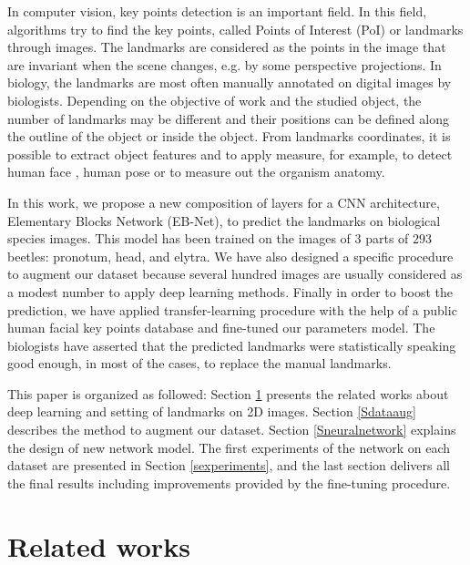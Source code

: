 \documentclass[review]{elsarticle}
\begin{document}
In computer vision, key points detection is an important field. In
this field, algorithms try to find the key points, called Points of
Interest (PoI)  or landmarks through images. The landmarks are
considered as the points in the image that are invariant when the
scene changes, e.g. by some perspective projections. In biology, the
landmarks are most often manually annotated on digital images by
biologists. Depending on the objective of work and the studied object,
the number of landmarks may be different and their positions
 can be defined along the outline of the object or inside the
object. From landmarks coordinates, it is possible to extract object
features and to apply measure, for example, to detect human face
\cite{sun2013deep}, human pose \cite{huang2017coarse} or to measure out the organism anatomy.

In this work, we propose  a new composition of layers for a CNN
architecture, Elementary Blocks Network (EB-Net), to predict the
landmarks on biological species images. This model has been 
trained on the images of $3$ parts of $293$ beetles: pronotum, head, and elytra. We have also designed a
specific procedure to augment our dataset because several hundred
images are usually considered as a modest number to apply deep
learning methods. Finally in order to boost the prediction, we have
applied transfer-learning procedure with the help of a public human
facial key points database and fine-tuned our parameters model. The biologists have
asserted that the predicted landmarks were
statistically speaking good enough, in most of the cases, to replace the manual
landmarks. 

This paper is organized as followed: Section \ref{related_works}
presents the related works about deep learning and setting of
landmarks on 2D images. Section \ref{Sdataaug} describes the method to
augment our dataset. Section \ref{Sneuralnetwork} explains the design
of new network model. The first experiments of the network on each
dataset are presented in Section \ref{sexperiments}, and the last
section delivers all the final results including improvements provided
by the fine-tuning procedure.


\section{Related works}
\label{related_works}
\end{document}
